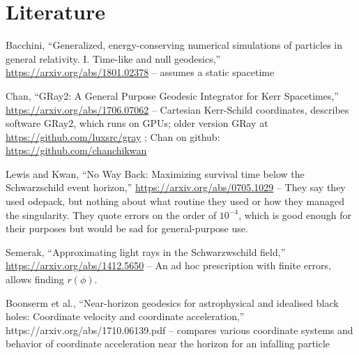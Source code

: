 \documentclass{article}
\begin{document}
\section{Literature}

Bacchini, ``Generalized, energy-conserving numerical simulations of particles
in general relativity. I. Time-like and null geodesics,''
\url{https://arxiv.org/abs/1801.02378} -- assumes a static spacetime

Chan, ``GRay2: A General Purpose Geodesic Integrator for Kerr Spacetimes,''
\url{https://arxiv.org/abs/1706.07062} --
Cartesian Kerr-Schild coordinates, describes software GRay2, which runs on GPUs;
older version GRay at \url{https://github.com/luxsrc/gray} ; Chan on github:
\url{https://github.com/chanchikwan}

Lewis and Kwan, ``No Way Back: Maximizing survival time below the Schwarzschild event horizon,''
\url{https://arxiv.org/abs/0705.1029} -- They say they used odepack, but nothing about what
routine they used or how they managed the singularity. They quote errors on the order of
$10^{-4}$, which is good enough for their purposes but would be sad for general-purpose use.

Semerak, ``Approximating light rays in the Schwarzwschild field,''
\url{https://arxiv.org/abs/1412.5650} -- An ad hoc prescription with finite errors,
allows finding $r(\phi)$.

Boonserm et al., ``Near-horizon geodesics for astrophysical and idealised
black holes: Coordinate velocity and coordinate acceleration,''
https://arxiv.org/abs/1710.06139.pdf -- compares various coordinate systems
and behavior of coordinate acceleration near the horizon for an infalling particle
\end{document}
